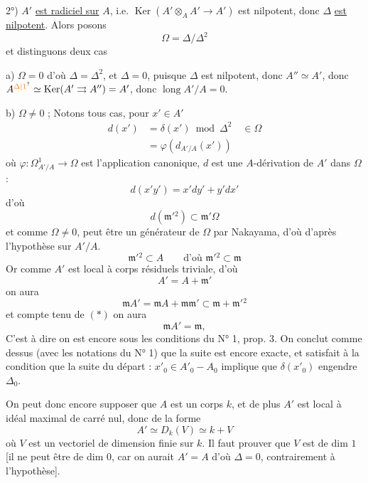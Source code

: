 2°) $A'$ \uline{est radiciel sur} $A$, i.e. $\operatorname{Ker}(A'\otimes_{A} A'\to A')$
est nilpotent, donc $\Delta$ \uline{est nilpotent}. Alors
posons
\[
\Omega=\Delta/\Delta^2
\]
et distinguons deux cas

a) $\Omega=0$ d'où $\Delta=\Delta^2$,  et $\Delta=0$,
puisque $\Delta$ est nilpotent, donc $A''\simeq A'$, donc
$A^{\unsure{\Delta|1}}\simeq\operatorname{Ker}(A'\rightrightarrows A'')=A'$, donc $\operatorname{long} A'/A=0$.

b) $\Omega\ne0$ ; Notons  tous cas, 
pour $x'\in A'$
\[
\begin{aligned}
d(x')&=\delta(x')\bmod\Delta^2\quad\in\Omega\\
&=\varphi(d_{A'/A}(x'))
\end{aligned}
\]
où $\varphi:\Omega^1_{A'/A}\to\Omega$ est l'application canonique,
$d$ est une $A$-dérivation de $A'$ dans $\Omega$ :
\[
d(x'y')=x'dy'+y'dx'
\]
d'où
\[
d(\mathfrak m'{}^2)\subset\mathfrak m'\Omega
\]
et comme $\Omega\ne0$,  
peut être un générateur de $\Omega$ par Nakayama,
d'où d'après  l'hypothèse sur $A'/A$.
\[
\mathfrak m'{}^2\subset A\qquad\text{d'où }\mathfrak m'{}^2\subset\mathfrak m \tag*{$(*)$}
\]
Or comme $A'$ est local à corps résiduels
triviale,  d'où
\[
A'=A+\mathfrak m'
\]
on aura
\[
\mathfrak m A'=\mathfrak m A+\mathfrak m\mathfrak m'\subset\mathfrak m+\mathfrak m'{}^2
\]
et compte tenu de $(*)$ on aura
\[
\mathfrak m A'=\mathfrak m,
\]
C'est à dire on est encore sous les
conditions du N° 1, prop. 3. On conclut
comme dessus (avec les notations du N° 1)
que la suite
est encore exacte, et satisfait à  la
 condition que la suite du départ :
$x'_0\in A'_0-A_0$ implique que $\delta(x'_0)$ engendre  $\Delta_0$.

On peut donc encore supposer que $A$ est un corps
$k$, et de plus $A'$ est local à idéal maximal
de carré nul, donc de la forme
\[
A'\simeq D_k(V)\simeq k+V
\]
où $V$ est un vectoriel de dimension finie sur $k$.
\deleted{[} Il faut prouver que $V$ est de dim $1$
[il ne peut être de dim $0$, car on aurait
$A'=A$ d'où $\Delta=0$, contrairement à l'hypothèse].

